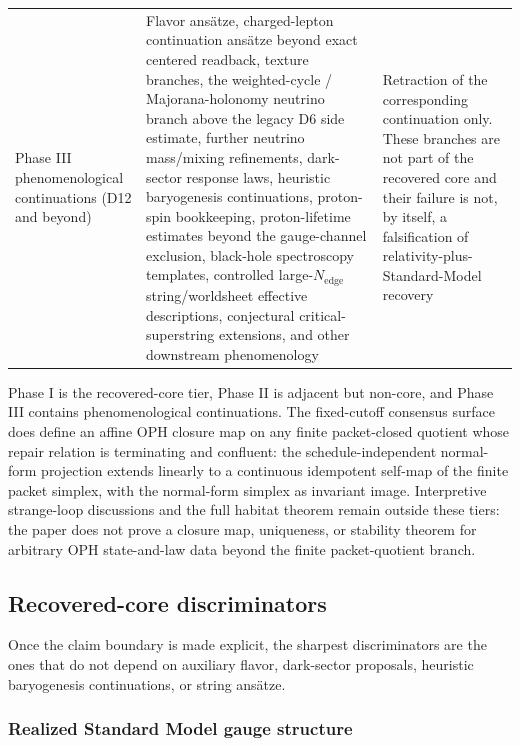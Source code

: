 \documentclass[11pt]{article}
\begin{document}
\begin{longtable}{@{}>{\raggedright\arraybackslash}p{}>{\raggedright\arraybackslash}p{}>{\raggedright\arraybackslash}p{}@{}}
Phase III phenomenological continuations (D12 and beyond) & Flavor ans\"atze, charged-lepton continuation ans\"atze beyond exact centered readback, texture branches, the weighted-cycle / Majorana-holonomy neutrino branch above the legacy D6 side estimate, further neutrino mass/mixing refinements, dark-sector response laws, heuristic baryogenesis continuations, proton-spin bookkeeping, proton-lifetime estimates beyond the gauge-channel exclusion, black-hole spectroscopy templates, controlled large-\(N_{\mathrm{edge}}\) string/worldsheet effective descriptions, conjectural critical-superstring extensions, and other downstream phenomenology & Retraction of the corresponding continuation only. These branches are not part of the recovered core and their failure is not, by itself, a falsification of relativity-plus-Standard-Model recovery \\
\end{longtable}
\endgroup

Phase I is the recovered-core tier, Phase II is adjacent but non-core, and Phase III contains phenomenological continuations. The fixed-cutoff consensus surface does define an affine OPH closure map on any finite packet-closed quotient whose repair relation is terminating and confluent: the schedule-independent normal-form projection extends linearly to a continuous idempotent self-map of the finite packet simplex, with the normal-form simplex as invariant image. Interpretive strange-loop discussions and the full habitat theorem remain outside these tiers: the paper does not prove a closure map, uniqueness, or stability theorem for arbitrary OPH state-and-law data beyond the finite packet-quotient branch.

\subsection{Recovered-core discriminators}

Once the claim boundary is made explicit, the sharpest discriminators are the ones that do not depend on auxiliary flavor, dark-sector proposals, heuristic baryogenesis continuations, or string ans\"atze.

\subsubsection{Realized Standard Model gauge structure}
\end{document}
